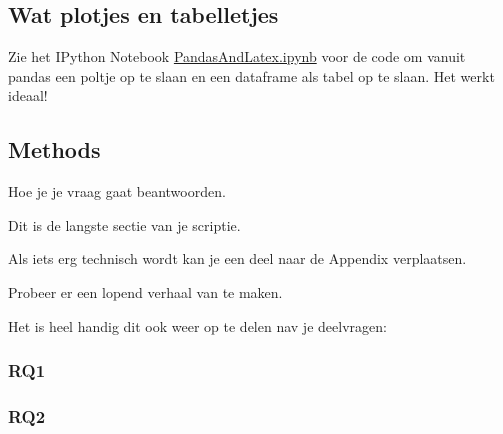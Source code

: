\subsection{Wat plotjes en tabelletjes}

Zie het IPython Notebook \url{PandasAndLatex.ipynb} voor de code om vanuit pandas een poltje op te slaan en een dataframe als tabel op te slaan. Het werkt ideaal! 





\pagebreak



\pagebreak
\subsection{Methods}
Hoe je je vraag gaat beantwoorden.


Dit is de langste sectie van je scriptie. 

Als iets erg technisch wordt kan je een deel naar de Appendix verplaatsen. 

Probeer er een lopend verhaal van te maken.

Het is heel handig dit ook weer op te delen nav je deelvragen:

\subsubsection{RQ1}

\subsubsection{RQ2}
